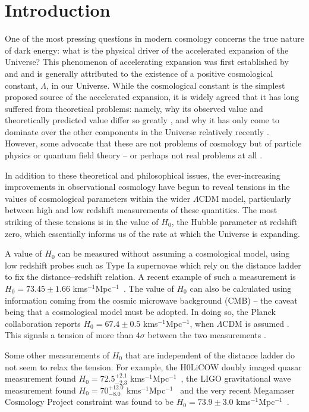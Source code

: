 \documentclass[final,3p,times,twocolumn]{elsarticle}
\newcommand*{\kmsMpc}{kms$^{-1}$Mpc$^{-1}$}
\begin{document}
\section{Introduction} \label{sec:intro}
One of the most pressing questions in modern cosmology concerns the true nature of dark energy: what is the physical driver of the accelerated expansion of the Universe? This phenomenon of accelerating expansion was first established by \cite{Riess1998} and \cite{Perlmutter1999} and is generally attributed to the existence of a positive cosmological constant, $\Lambda$, in our Universe. While  the cosmological constant is the simplest proposed source of the accelerated expansion,  it is widely agreed that it has long suffered from theoretical problems: namely, why its observed value and theoretically predicted value differ so greatly \citep{Adler1995, Weinberg1989, Martin2012}, and why it has only come to dominate over the other components in the Universe relatively recently \citep{Velten:2014nra}. However, some advocate that these are not problems of cosmology but of particle physics or quantum field theory -- or perhaps not real problems at all \cite{Bianchi:2010uw}.

In addition to these theoretical and philosophical issues, the ever-increasing improvements in observational cosmology have begun to reveal tensions in the values of cosmological parameters within the wider $\Lambda$CDM model, particularly between high and low redshift measurements of these quantities. The most striking of these tensions is in the value of $H_0$, the Hubble parameter at redshift zero, which essentially informs us of the rate at which the Universe is expanding.

A value of $H_0$ can be measured without assuming a cosmological model, using low redshift probes such as Type Ia supernovae which rely on the distance ladder to fix the distance--redshift relation. A recent example of such a measurement is $H_0 = 73.45 \pm 1.66$ \kmsMpc \ \citep{Riess2018}. The value of $H_0$ can also be calculated using information coming from the cosmic microwave background (CMB) -- the caveat being that a cosmological model must be adopted. In doing so, the Planck collaboration reports $H_0 = 67.4 \pm 0.5 $ \kmsMpc, when $\Lambda$CDM is assumed \citep{Aghanim:2018eyx}. This signals a tension of more than $4 \sigma$  between the two measurements \citep{Riess:2019cxk}.

Some other measurements of $H_0$ that are independent of the distance ladder do not seem to relax the tension. For example, the H0LiCOW doubly imaged quasar measurement found $H_0 = 72.5^{+2.1}_{-2.3}$ \kmsMpc \ \citep{Birrer2018}, the LIGO gravitational wave measurement found $H_0 = 70^{+12.0}_{-8.0}$ \kmsMpc \ \citep{Abbott:2017xzu} and the very recent Megamaser Cosmology Project constraint was found to be $H_0 = 73.9 \pm 3.0$ \kmsMpc \ \cite{Pesce:2020xfe}.
\end{document}
